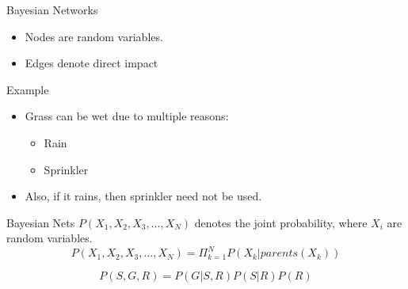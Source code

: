 \documentclass{beamer}
\begin{document}
\begin{frame}{Bayesian Networks}
        
\begin{itemize}
	
	
	\item Nodes are random variables.
	\item Edges denote direct impact

	
\end{itemize}
\end{frame}

\begin{frame}{Example}
\begin{itemize}

\item Grass can be wet due to multiple reasons:
\begin{itemize}
    \item Rain
    \item Sprinkler
\end{itemize}
\item Also, if it rains, then sprinkler need not be used.
\end{itemize}

    


	

\end{frame}

\begin{frame}{Bayesian Nets}
    $P(X_{1},X_{2},X_{3},\dots,X_{N})$ denotes the joint probability, where $X_{i}$ are random variables.
    \begin{equation*}
        P(X_{1},X_{2},X_{3},\dots,X_{N}) = \Pi_{k=1}^{N} P(X_{k} | parents(X_{k}))
    \end{equation*}
    
    
    \begin{equation*}
        P(S,G,R) =  P(G|S,R)P(S|R)P(R)
    \end{equation*}
    
\end{frame}
\end{document}
